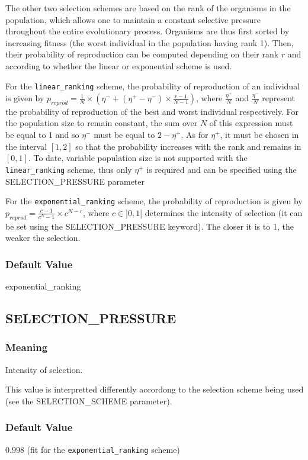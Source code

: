 The other two selection schemes are based on the rank of the organisms in the population, which allows one to maintain a constant selective pressure throughout the entire evolutionary process. Organisms are thus first sorted by increasing fitness (the worst individual in the population having rank 1). Then, their probability of reproduction can be computed depending on their rank $r$ and according to whether the linear or exponential scheme is used.

For the \verb?linear_ranking? scheme, the probability of reproduction of an individual is given by $p_{reprod} = \frac{1}{N}\times{}(\eta{}^- + (\eta{}^+ - \eta{}^-)\times{}\frac{r - 1}{N - 1})$, where $\frac{\eta{}^+}{N}$ and $\frac{\eta{}^-}{N}$ represent the probability of reproduction of the best and worst individual respectively. For the population size to remain constant, the sum over $N$ of this expression must be equal to 1 and so $\eta{}^-$ must be equal to $2 - \eta{}^+$. As for $\eta{}^+$, it must be chosen in the interval $[1,2]$ so that the probability increases with the rank and remains in $[0,1]$. To date, variable population size is not supported with the \verb?linear_ranking? scheme, thus only $\eta{}^+$ is required and can be specified using the SELECTION\_PRESSURE parameter

For the \verb?exponential_ranking? scheme, the probability of reproduction is given by $p_{reprod} = \frac{c - 1}{c^N - 1}\times{}c^{N-r}$, where $c \in ]0,1[$ determines the intensity of selection (it can be set using the SELECTION\_PRESSURE keyword). The closer it is to 1, the weaker the selection.
\subsubsection{Default Value}
exponential\_ranking

\subsection{SELECTION\_PRESSURE}
\subsubsection{Meaning}
Intensity of selection.

This value is interpretted differently accordong to the selection scheme being used (see the SELECTION\_SCHEME parameter).
\subsubsection{Default Value}
$0.998$ (fit for the \verb?exponential_ranking? scheme)



